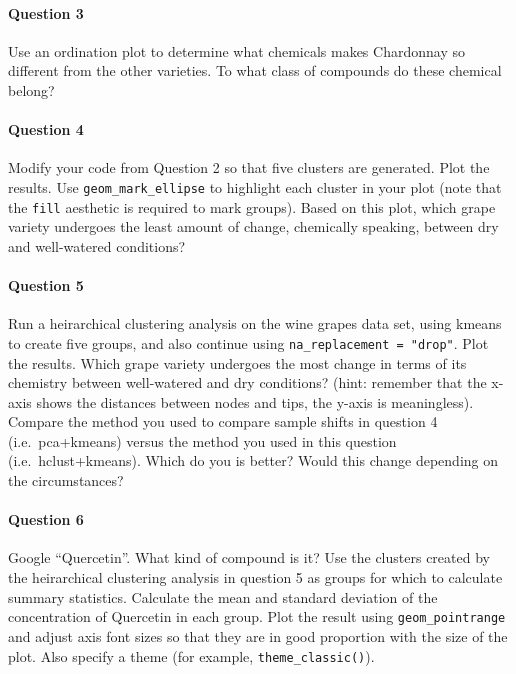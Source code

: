 \documentclass[
]{krantz}
\begin{document}
\hypertarget{question-3}{%
\paragraph{Question 3}\label{question-3}}

Use an ordination plot to determine what chemicals makes Chardonnay so different from the other varieties. To what class of compounds do these chemical belong?

\hypertarget{question-4}{%
\paragraph{Question 4}\label{question-4}}

Modify your code from Question 2 so that five clusters are generated. Plot the results. Use \texttt{geom\_mark\_ellipse} to highlight each cluster in your plot (note that the \texttt{fill} aesthetic is required to mark groups). Based on this plot, which grape variety undergoes the least amount of change, chemically speaking, between dry and well-watered conditions?

\hypertarget{question-5}{%
\paragraph{Question 5}\label{question-5}}

Run a heirarchical clustering analysis on the wine grapes data set, using kmeans to create five groups, and also continue using \texttt{na\_replacement\ =\ "drop"}. Plot the results. Which grape variety undergoes the most change in terms of its chemistry between well-watered and dry conditions? (hint: remember that the x-axis shows the distances between nodes and tips, the y-axis is meaningless). Compare the method you used to compare sample shifts in question 4 (i.e.~pca+kmeans) versus the method you used in this question (i.e.~hclust+kmeans). Which do you is better? Would this change depending on the circumstances?

\hypertarget{question-6}{%
\paragraph{Question 6}\label{question-6}}

Google ``Quercetin''. What kind of compound is it? Use the clusters created by the heirarchical clustering analysis in question 5 as groups for which to calculate summary statistics. Calculate the mean and standard deviation of the concentration of Quercetin in each group. Plot the result using \texttt{geom\_pointrange} and adjust axis font sizes so that they are in good proportion with the size of the plot. Also specify a theme (for example, \texttt{theme\_classic()}).
\end{document}
